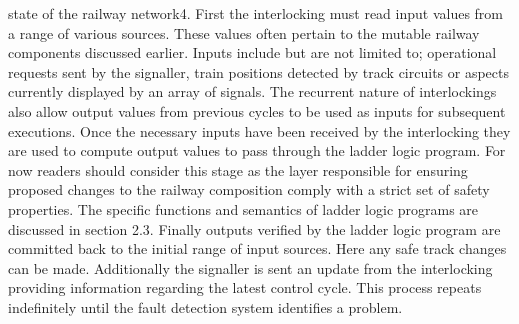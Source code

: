 \documentclass[runningheads]{llncs}
\begin{document}
state of the railway network4. First the interlocking must read input values from a range of
various sources. These values often pertain to the mutable railway components discussed
earlier. Inputs include but are not limited to; operational requests sent by the signaller,
train positions detected by track circuits or aspects currently displayed by an array of
signals. The recurrent nature of interlockings also allow output values from previous
cycles to be used as inputs for subsequent executions.
Once the necessary inputs have been received by the interlocking they are used to
compute output values to pass through the ladder logic program. For now readers should
consider this stage as the layer responsible for ensuring proposed changes to the railway
composition comply with a strict set of safety properties. The specific functions and
semantics of ladder logic programs are discussed in section 2.3.
Finally outputs verified by the ladder logic program are committed back to the initial
range of input sources. Here any safe track changes can be made. Additionally the signaller
is sent an update from the interlocking providing information regarding the latest control
cycle. This process repeats indefinitely until the fault detection system identifies a problem.
\end{document}
